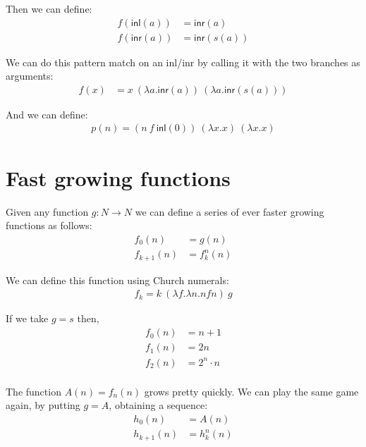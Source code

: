 Then we can define:
\begin{align*}
  f(\mathsf{inl}(a)) &= \mathsf{inr}(a)\\
  f(\mathsf{inr}(a)) &= \mathsf{inr}(s(a))
\end{align*}

We can do this pattern match on an inl/inr by calling it with the two branches as arguments:
\begin{align*}
  f(x) &= x\ (\lambda a. \mathsf{inr}(a))\ (\lambda a.\mathsf{inr}(s(a)))
\end{align*}


And we can define:
\begin{align*}
  p(n) = (n\ f\ \mathsf{inl}(0))\ (\lambda x. x)\ (\lambda x. x)
\end{align*}

\section*{Fast growing functions}
Given any function $g : N \to N$ we can define a series of ever faster growing functions as follows:
\begin{align*}
  f_0(n) &= g(n)\\
  f_{k+1}(n) &= f^n_k(n)
\end{align*}

We can define this function using Church numerals:
\begin{align*}
  f_k = k\ (\lambda f. \lambda n. n f n)\ g
\end{align*}

If we take $g = s$ then,
\begin{align*}
  f_0(n) &= n+1\\
  f_1(n) &= 2n\\
  f_2(n) &= 2^n \cdot n\\
\end{align*}

The function $A(n) = f_n(n)$ grows pretty quickly. We can play the same game again, by putting $g = A$, obtaining a sequence:
\begin{align*}
  h_0(n) &= A(n)\\
  h_{k+1}(n) &= h^n_k(n)
\end{align*}

